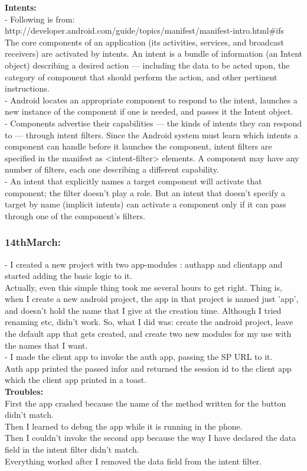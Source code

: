\documentclass[11pt]{article}
\begin{document}
\textbf{Intents:}\\
- Following is from: http://developer.android.com/guide/topics/manifest/manifest-intro.html\#ifs\\
The core components of an application (its activities, services, and broadcast receivers) are activated by intents. An intent is a bundle of 
information (an Intent object) describing a desired action — including the data to be acted upon, the category of component that should perform the 
action, and other pertinent instructions. \\

- Android locates an appropriate component to respond to the intent, launches a new instance of the 
component if one is needed, and passes it the Intent object.\\

- Components advertise their capabilities — the kinds of intents they can respond to — through intent filters. Since the Android system must learn 
which intents a component can handle before it launches the component, intent filters are specified in the manifest as <intent-filter> elements. A 
component may have any number of filters, each one describing a different capability.\\

- An intent that explicitly names a target component will activate that component; the filter doesn't play a role. But an intent that doesn't specify 
a target by name (implicit intents) can activate a component only if it can pass through one of the component's filters. 

\subsubsection*{14thMarch:}
- I created a new project with two app-modules : authapp and clientapp and started adding the basic logic to it.\\
Actually, even this simple thing took me several hours to get right. Thing is, when I create a new android  project, the app in that project is named 
just 'app', and doesn't hold the name that I give at the creation time. Although I tried renaming etc, didn't work. So, what I did was: create the 
android project, leave the default app that gets created, and create two new modules for my use with the names that I want.\\

- I made the client app to invoke the auth app, passing the SP URL to it.\\
Auth app printed the passed infor and returned the session id to the client app which the client app printed in a toast.\\
 \textbf{Troubles:}\\
 First the app crashed because the name of the method written for the button didn't match.\\
 Then I learned to debug the app while it is running in the phone.\\
 Then I couldn't invoke the second app because the way I have declared the data field in the intent filter didn't match.\\
 Everything worked after I removed the data field from the intent filter.
 
\end{document}
